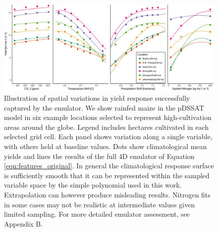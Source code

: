 \begin{figure}[ht]
\centering
    \includegraphics[width=16cm]{figures/regression_areas.png}
    \caption{Illustration of spatial variations in yield response successfully captured by the emulator. 
    We show rainfed maize in the pDSSAT model in six example locations selected to represent high-cultivation areas around the globe. 
    Legend includes hectares cultivated in each selected grid cell. 
    Each panel shows variation along a single variable, with others held at baseline values. 
    Dots show climatological mean yields and lines the results of the full 4D emulator of Equation \ref{eqn:features_original}. 
    In general the climatological response surface is sufficiently smooth that it can be represented within the sampled variable space by the simple polynomial used in this work. 
    Extrapolation can however produce misleading results. 
    Nitrogen fits in some cases may not be realistic at intermediate values given limited sampling. 
    For more detailed emulator assessment, see Appendix B.}
   \label{fig:regression}
\end{figure}

